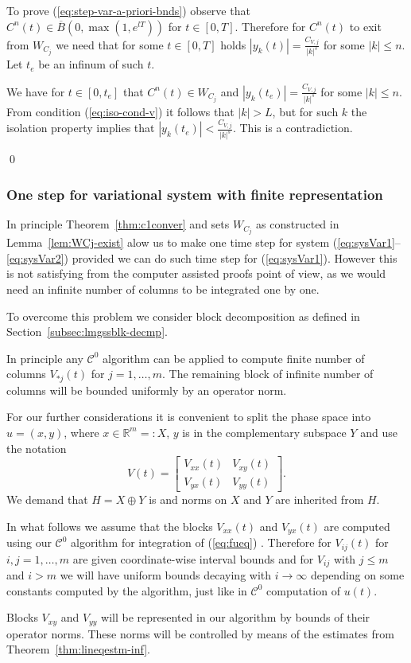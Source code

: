 To prove (\ref{eq:step-var-a-priori-bnds}) observe that $C^n(t) \in \overline{B}(0,\max(1,e^{lT})) $ for $t \in [0,T]$. Therefore for $C^n(t)$ to exit from
$W_{C_j}$ we need that for some $t \in [0,T]$ holds $|y_k(t)|=\frac{C_{V,j}}{|k|^s}$ for some $|k| \leq n$.  Let $t_e$ be an infinum of such $t$.

We have for $t \in [0,t_e]$ that $C^n(t) \in W_{C_j}$ and  $|y_k(t_e)|=\frac{C_{V,j}}{|k|^s}$ for some $|k| \leq n$.  From condition (\ref{eq:iso-cond-v})
it follows that $|k|>L$, but for such $k$ the isolation property implies that $|y_k(t_e)|<\frac{C_{V,j}}{|k|^s}$. This is a contradiction.

\qed


\subsubsection{One step for variational system with finite representation}

In principle Theorem~\ref{thm:c1conver} and sets $W_{C_j}$ as constructed in Lemma~\ref{lem:WCj-exist} alow us to make one time step for system (\ref{eq:sysVar1}--\ref{eq:sysVar2}) provided
we can do such time step for  (\ref{eq:sysVar1}). However this is not satisfying from the computer assisted proofs point of view, as we would need an infinite number of columns to
be integrated one by one. 

To overcome this problem 
we consider block decomposition as defined in Section~\ref{subsec:lmgssblk-decmp}.

In principle any $\mathcal C^0$ algorithm can be applied to compute finite number of columns $V_{*j}(t)$ for $j=1,\dots,m$. The remaining block of infinite number of columns will be bounded uniformly by an operator norm.

For our further considerations it is convenient to split the phase space into $u=(x,y)$, where $x\in \mathbb{R}^m=:X$, $y$ is in the complementary subspace $Y$ and use the notation
\begin{equation*}
  V(t) =\left[\begin{array}{cc}
                  V_{xx}(t) & V_{xy}(t) \\
                   V_{yx}(t) & V_{yy}(t)
               \end{array}
        \right].
\end{equation*}
We  demand that $H=X \oplus Y$ is \gss and norms on $X$ and $Y$ are inherited from $H$.

In what follows we assume that the blocks $V_{xx}(t)$ and $V_{yx}(t)$ are computed using our $\mathcal C^0$ algorithm for integration of (\ref{eq:fueq}) .
Therefore for $V_{ij}(t)$ for $i,j=1,\dots,m$ are given coordinate-wise interval bounds and for  $V_{ij}$ with $j \leq m$ and $i>m$ we will have uniform bounds decaying with $i \to \infty$ depending on some constants computed by the algorithm, just like in $\mathcal C^0$ computation of $u(t)$.

Blocks  $V_{xy}$ and $V_{yy}$  will be represented in our algorithm by bounds of their operator norms. These norms will be controlled by means of the estimates from Theorem~\ref{thm:lineqestm-inf}.




